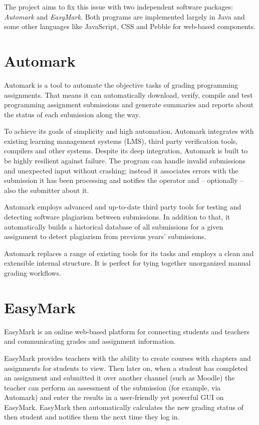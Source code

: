 \documentclass[12pt,a4paper,oneside]{report}
\begin{document}
	The project aims to fix this issue with two independent software packages: \emph{Automark} and \emph{EasyMark}. Both programs are implemented largely in Java and some other languages like JavaScript, CSS and Pebble\parencite{pebblewebsite} for web-based components.

	\section{Automark}
	Automark is a tool to automate the objective tasks of grading programming assignments. That means it can automatically download, verify, compile and test programming assignment submissions and generate summaries and reports about the status of each submission along the way.

	To achieve its goals of simplicity and high automation, Automark integrates with existing learning management systems (LMS), third party verification tools, compilers and other systems. Despite its deep integration, Automark is built to be highly resilient against failure. The program can handle invalid submissions and unexpected input without crashing; instead it associates errors with the submission it has been processing and notifies the operator and -- optionally -- also the submitter about it.

	Automark employs advanced and up-to-date third party tools for testing and detecting software plagiarism between submissions. In addition to that, it automatically builds a historical database of all submissions for a given assignment to detect plagiarism from previous years' submissions.

	Automark replaces a range of existing tools for its tasks and employs a clean and extensible internal structure. It is perfect for tying together unorganized manual grading workflows.

	\pagebreak
	\section{EasyMark}
	EasyMark is an online web-based platform for connecting students and teachers and communicating grades and assignment information.

	EasyMark provides teachers with the ability to create courses with chapters and assignments for students to view. Then later on, when a student has completed an assignment and submitted it over another channel (such as Moodle) the teacher can perform an assessment of the submission (for example, via Automark) and enter the results in a user-friendly yet powerful GUI on EasyMark. EasyMark then automatically calculates the new grading status of then student and notifies them the next time they log in.
\end{document}
